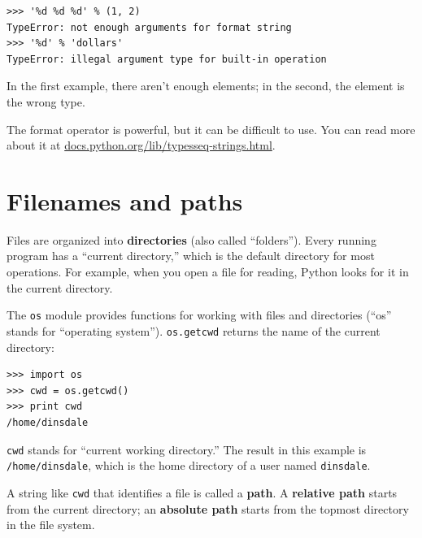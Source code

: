 \documentclass[10pt]{book}
\begin{document}
\begin{CJK}{UTF8}{gbsn}
\begin{verbatim}
>>> '%d %d %d' % (1, 2)
TypeError: not enough arguments for format string
>>> '%d' % 'dollars'
TypeError: illegal argument type for built-in operation
\end{verbatim}
%
In the first example, there aren't enough elements; in the
second, the element is the wrong type.

The format operator is powerful, but it can be difficult to use.  You
can read more about it at
\url{docs.python.org/lib/typesseq-strings.html}.




\section{Filenames and paths}
\label{paths}

Files are organized into {\bf directories} (also called ``folders'').
Every running program has a ``current directory,'' which is the
default directory for most operations.  
For example, when you open a file for reading, Python looks for it in the
current directory.

The {\tt os} module provides functions for working with files and
directories (``os'' stands for ``operating system'').  {\tt os.getcwd}
returns the name of the current directory:

\begin{verbatim}
>>> import os
>>> cwd = os.getcwd()
>>> print cwd
/home/dinsdale
\end{verbatim}
%
{\tt cwd} stands for ``current working directory.''  The result in
this example is {\tt /home/dinsdale}, which is the home directory of a
user named {\tt dinsdale}.

A string like {\tt cwd} that identifies a file is called a {\bf path}.
A {\bf relative path} starts from the current directory;
an {\bf absolute path} starts from the topmost directory in the
file system.


\end{CJK}
\end{document}
